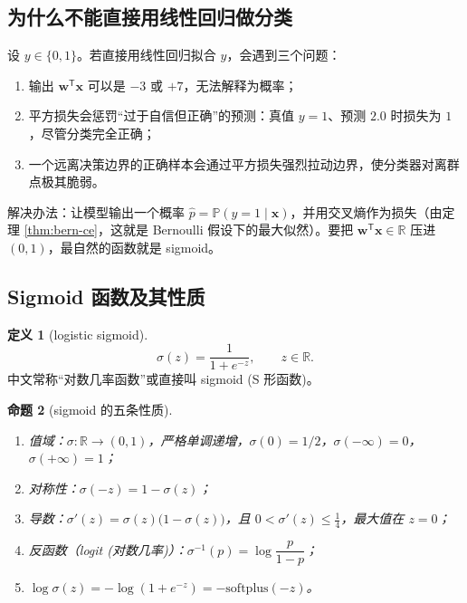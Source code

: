 \documentclass[UTF8,a4paper,11pt]{ctexart}
\theoremstyle{definition}
\newtheorem{definition}{定义}[section]
\theoremstyle{plain}
\newtheorem{proposition}[definition]{命题}
\theoremstyle{remark}
\newcommand{\R}{\mathbb{R}}
\newcommand{\Prob}{\mathbb{P}}
\newcommand{\T}{^{\mathsf{T}}}
\newcommand{\eng}[1]{\textup{(#1)}}
\begin{document}
\subsection{为什么不能直接用线性回归做分类}

设 $y\in\{0,1\}$。若直接用线性回归拟合 $y$，会遇到三个问题：
\begin{enumerate}[label=(\arabic*)]
  \item 输出 $\bm{w}\T\bm{x}$ 可以是 $-3$ 或 $+7$，无法解释为概率；
  \item 平方损失会惩罚“过于自信但正确”的预测：真值 $y=1$、预测 $2.0$ 时损失为 $1$，尽管分类完全正确；
  \item 一个远离决策边界的正确样本会通过平方损失强烈拉动边界，使分类器对离群点极其脆弱。
\end{enumerate}
解决办法：让模型输出一个概率 $\hat p=\Prob(y=1\mid\bm{x})$，并用交叉熵作为损失（由定理 \ref{thm:bern-ce}，这就是 Bernoulli 假设下的最大似然）。要把 $\bm{w}\T\bm{x}\in\R$ 压进 $(0,1)$，最自然的函数就是 sigmoid。

\subsection{Sigmoid 函数及其性质}

\begin{definition}[logistic sigmoid]\label{def:sigmoid}
\[
  \sigma(z)=\frac{1}{1+e^{-z}},\qquad z\in\R .
\]
中文常称“对数几率函数”或直接叫 sigmoid \eng{S 形函数}。
\end{definition}

\begin{proposition}[sigmoid 的五条性质]\label{prop:sigmoid}
\begin{enumerate}[label=(\arabic*)]
  \item 值域：$\sigma:\R\to(0,1)$，严格单调递增，$\sigma(0)=1/2$，$\sigma(-\infty)=0$，$\sigma(+\infty)=1$；
  \item 对称性：$\sigma(-z)=1-\sigma(z)$；
  \item 导数：$\sigma'(z)=\sigma(z)\big(1-\sigma(z)\big)$，且 $0<\sigma'(z)\le\tfrac14$，最大值在 $z=0$；
  \item 反函数（logit \eng{对数几率}）：$\sigma^{-1}(p)=\log\dfrac{p}{1-p}$；
  \item $\log\sigma(z)=-\log(1+e^{-z})=-\mathrm{softplus}(-z)$。
\end{enumerate}
\end{proposition}
\end{document}
